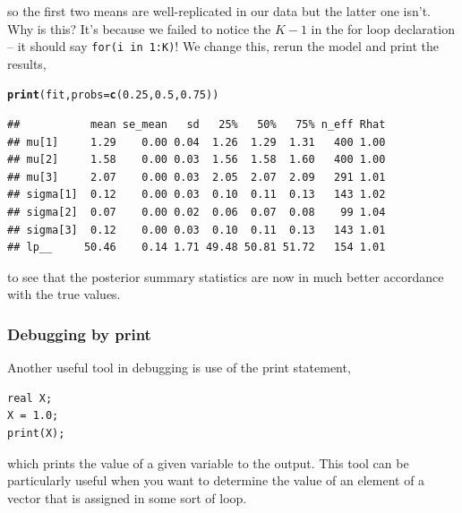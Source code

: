 \documentclass[11pt,fullpage]{book}
\makeatletter
\newenvironment{kframe}{%
	\def\at@end@of@kframe{}%
	\ifinner\ifhmode%
	\def\at@end@of@kframe{\end{minipage}}%
\begin{minipage}{\columnwidth}%
	\fi\fi%
	\def\FrameCommand##1{\hskip\@totalleftmargin \hskip-\fboxsep
		\colorbox{shadecolor}{##1}\hskip-\fboxsep
		\hskip-\linewidth \hskip-\@totalleftmargin \hskip\columnwidth}%
	\MakeFramed {\advance\hsize-\width
		\@totalleftmargin\z@ \linewidth\hsize
		\@setminipage}}%
{\par\unskip\endMakeFramed%
	\at@end@of@kframe}
\newcommand{\hlnum}[1]{\textcolor[rgb]{0.686,0.059,0.569}{#1}}%
\newcommand{\hlstd}[1]{\textcolor[rgb]{0.345,0.345,0.345}{#1}}%
\newcommand{\hlkwc}[1]{\textcolor[rgb]{0.333,0.667,0.333}{#1}}%
\newcommand{\hlkwd}[1]{\textcolor[rgb]{0.737,0.353,0.396}{\textbf{#1}}}%
\newenvironment{knitrout}{}{} %
\makeatother
\begin{document}
so the first two means are well-replicated in our data but the latter one isn't. Why is this? It's because we failed to notice the $K-1$ in the for loop declaration -- it should say \texttt{for(i in 1:K)}! We change this, rerun the model and print the results,

\begin{knitrout}\small
		\color{fgcolor}\begin{kframe}
\begin{alltt}
\hlkwd{print}\hlstd{(fit,}\hlkwc{probs} \hlstd{=} \hlkwd{c}\hlstd{(}\hlnum{0.25}\hlstd{,}\hlnum{0.5}\hlstd{,}\hlnum{0.75}\hlstd{))}
\end{alltt}
\begin{verbatim}
##           mean se_mean   sd   25%   50%   75% n_eff Rhat
## mu[1]     1.29    0.00 0.04  1.26  1.29  1.31   400 1.00
## mu[2]     1.58    0.00 0.03  1.56  1.58  1.60   400 1.00
## mu[3]     2.07    0.00 0.03  2.05  2.07  2.09   291 1.01
## sigma[1]  0.12    0.00 0.03  0.10  0.11  0.13   143 1.02
## sigma[2]  0.07    0.00 0.02  0.06  0.07  0.08    99 1.04
## sigma[3]  0.12    0.00 0.03  0.10  0.11  0.13   143 1.01
## lp__     50.46    0.14 1.71 49.48 50.81 51.72   154 1.01
\end{verbatim}
		\end{kframe}
	\end{knitrout}

to see that the posterior summary statistics are now in much better accordance with the true values.

\subsubsection{Debugging by print}
Another useful tool in debugging is use of the print statement,

\begin{verbatim}
real X;
X = 1.0;
print(X);
\end{verbatim}

which prints the value of a given variable to the output. This tool can be particularly useful when you want to determine the value of an element of a vector that is assigned in some sort of loop.
\end{document}
